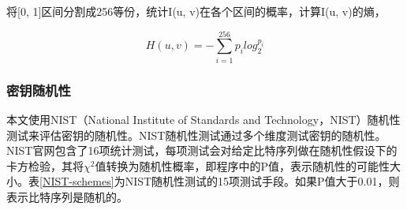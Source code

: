 \documentclass[master]{seuthesis} %
\begin{document}
\begin{Main}
将[0, 1]区间分割成256等份，统计I(u, v)在各个区间的概率，计算I(u, v)的熵，

\begin{equation} \label{entropy_fft2d_equation}
  H(u, v) = -\sum_{i=1}^{256} p_i log_2^{p_i}
\end{equation}

\subsubsection{密钥随机性}

本文使用NIST（National Institute of Standards and Technology，NIST）随机性测试来评估密钥的随机性\cite{bassham2010statistical}。NIST随机性测试通过多个维度测试密钥的随机性\cite{zaman2012review}。NIST官网包含了16项统计测试，每项测试会对给定比特序列做在随机性假设下的卡方检验，其将$\chi^2$值转换为随机性概率，即程序中的P值，表示随机性的可能性大小。表\ref{NIST-schemes}为NIST随机性测试的15项测试手段。如果P值大于0.01，则表示比特序列是随机的。



\end{Main}
\end{document}
